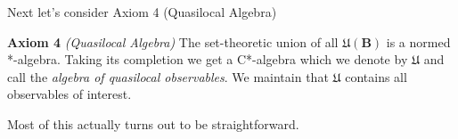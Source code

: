 Next let's consider Axiom 4 (Quasilocal Algebra)

\textbf{Axiom 4} \textit{(Quasilocal Algebra)} The set-theoretic union of all $\mathfrak{U}(\mathbf{B})$ is a normed *-algebra. Taking its completion we get a C*-algebra which we denote by $\mathfrak{U}$ and call the \textit{algebra of quasilocal observables}. We maintain that $\mathfrak{U}$ contains all observables of interest.

Most of this actually turns out to be straightforward.
